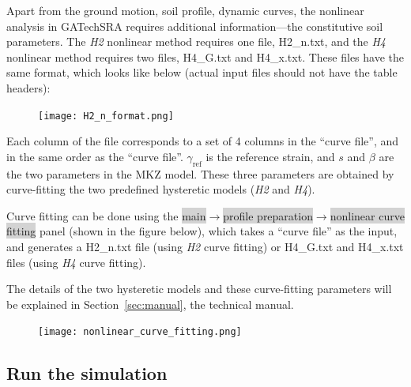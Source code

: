 \documentclass[11pt,letterpaper]{article}
\newcommand{\panel}[1]{\colorbox{lightgray}{\textsf{#1}}}
\begin{document}
Apart from the ground motion, soil profile, dynamic curves, the nonlinear analysis in GATechSRA requires additional information---the constitutive soil parameters. The \emph{H2} nonlinear method requires one file, \textsf{H2\_n.txt}, and the \emph{H4} nonlinear method requires two files, \textsf{H4\_G.txt} and \textsf{H4\_x.txt}.  These files have the same format, which looks like below (actual input files should not have the table headers):

\begin{figure}[H]
\centering
  \texttt{[image: H2\_n\_format.png]}\\
\end{figure}

Each column of the file corresponds to a set of 4 columns in the ``curve file'', and in the same order as the ``curve file''. $\gamma_{\text{ref}}$ is the reference strain, and $s$ and $\beta$ are the two parameters in the MKZ model. These three parameters are obtained by curve-fitting the two predefined hysteretic models (\emph{H2} and \emph{H4}).

Curve fitting can be done using the \panel{main}$\rightarrow$\panel{profile preparation}$\rightarrow$\panel{nonlinear curve fitting} panel (shown in the figure below), which takes a ``curve file'' as the input, and generates a \textsf{H2\_n.txt} file (using \emph{H2} curve fitting) or \textsf{H4\_G.txt} and \textsf{H4\_x.txt} files (using \emph{H4} curve fitting).

The details of the two hysteretic models and these curve-fitting parameters will be explained in Section~\ref{sec:manual}, the technical manual.


\begin{figure}[H]
\centering
  \texttt{[image: nonlinear\_curve\_fitting.png]}\\
\end{figure}


\newpage
\subsection{Run the simulation}
\end{document}
